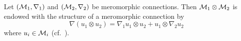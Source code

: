 \begin{rem}
  Let $(\mathcal{M}_1,\nabla_1)$ and $(\mathcal{M}_2,\nabla_2)$ be meromorphic connections.
  Then $\mathcal{M}_1\otimes\mathcal{M}_2$ is endowed with the structure of a meromorphic
  connection by
  \[
  \nabla(u_1\otimes u_2)=\nabla_1u_1\otimes u_2+u_1\otimes\nabla_2u_2
  \]
  where $u_i\in\mathcal{M}_i$ (cf.\ \cite[129]{hotta2008}).
  \begin{comment}
    $\Hom_{\C(\!\{t\}\!)}(\cM_1,\cM_2)$ is endowed with the structure of a
    meromorphic connection by
    \[
    (\nabla\phi)(u_1)=\nabla_2(\phi(u_1))-\phi(\nabla_1 u_1)
    \]
    where $\phi\in\Hom_{\C(\!\{t\}\!)}(\cM_1,\cM_2)$ and $u_i\in\cM_i$.
  \end{comment}
\end{rem}

\begin{comment}
  \begin{lem}
    \PROBLEM[how looks the connection matrix? Simply the sum?]
    Let $(\cM_1,\nabla_1)$ and $(\cM_2,\nabla_2)$ be meromorphic connections
    with connection matrices $A_1$ and $A_2$.
    The connection matrix of $(\cM_1\otimes\cM_2,\nabla)$ is then given by
    $A_1+A_2$.
  \end{lem}
  \begin{proof}
    Let $u_1\otimes u_2\in\cM_1\otimes\cM_2$.
    \begin{align*}
      \nabla(u_1\otimes u_2) &=\nabla_1u_1\otimes u_2+u_1\otimes\nabla_2u_2
      \\&=(\nabla_1u_1)\otimes u_2+u_1\otimes\nabla_2u_2
    \end{align*}
  \end{proof}
\end{comment}

\begin{comment}
  \subsubsection{Formalization}
  \begin{multicols}{2}
    Let $[A]$ be a system. We \rewrite{view it as a formal system, by} allowing
    formal solutions.
    \TODO{}

    \columnbreak

    Let $(\cM,\nabla)$ be a meromorphic connection. The connection $\nabla$
    naturally extends to $\hat\cM:=\cM\otimes\C(\!(t)\!)$ and
    $\tilde\cM_\theta:=\cM\otimes\cA_\theta$.
    \TODO{}
  \end{multicols}
\end{comment}


